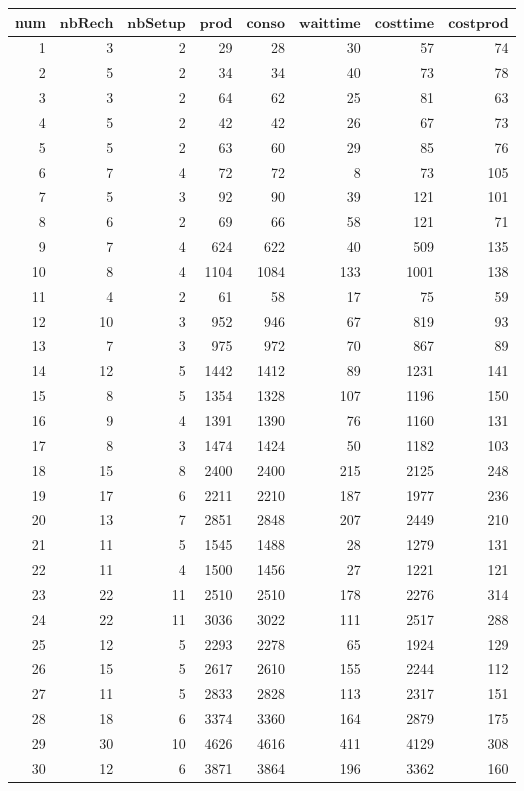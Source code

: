 {\begin{table}[H]
	\centering
	\small{
		\begin{tabular}{|r|r|r|r|r|r|r|r|}
			\hline
			\toprule
			\rowcolor{cyan}	\textbf{num} &$\mathbf{nbRech}$ & $\mathbf{nbSetup}$ & $\mathbf{prod}$ &  $\mathbf{conso} $ & $\mathbf{wait time}$ & $\mathbf{cost time}$ & $\mathbf{cost prod}$  \\
			\midrule
			\hline
			1	&	3	&	2	&	29	&	28	&	30	&	57	&	74	\\ \hline
			2	&	5	&	2	&	34	&	34	&	40	&	73	&	78	\\ \hline
			3	&	3	&	2	&	64	&	62	&	25	&	81	&	63	\\ \hline
			4	&	5	&	2	&	42	&	42	&	26	&	67	&	73	\\ \hline
			5	&	5	&	2	&	63	&	60	&	29	&	85	&	76	\\ \hline
			6	&	7	&	4	&	72	&	72	&	8	&	73	&	105	\\ \hline
			7	&	5	&	3	&	92	&	90	&	39	&	121	&	101	\\ \hline
			8	&	6	&	2	&	69	&	66	&	58	&	121	&	71	\\ \hline
			9	&	7	&	4	&	624	&	622	&	40	&	509	&	135	\\ \hline
			10	&	8	&	4	&	1104	&	1084	&	133	&	1001	&	138	\\ \hline
			11	&	4	&	2	&	61	&	58	&	17	&	75	&	59	\\ \hline
			12	&	10	&	3	&	952	&	946	&	67	&	819	&	93	\\ \hline
			13	&	7	&	3	&	975	&	972	&	70	&	867	&	89	\\ \hline
			14	&	12	&	5	&	1442	&	1412	&	89	&	1231	&	141	\\ \hline
			15	&	8	&	5	&	1354	&	1328	&	107	&	1196	&	150	\\ \hline
			16	&	9	&	4	&	1391	&	1390	&	76	&	1160	&	131	\\ \hline
			17	&	8	&	3	&	1474	&	1424	&	50	&	1182	&	103	\\ \hline
			18	&	15	&	8	&	2400	&	2400	&	215	&	2125	&	248	\\ \hline
			19	&	17	&	6	&	2211	&	2210	&	187	&	1977	&	236	\\ \hline
			20	&	13	&	7	&	2851	&	2848	&	207	&	2449	&	210	\\ \hline
			21	&	11	&	5	&	1545	&	1488	&	28	&	1279	&	131	\\ \hline
			22	&	11	&	4	&	1500	&	1456	&	27	&	1221	&	121	\\ \hline
			23	&	22	&	11	&	2510	&	2510	&	178	&	2276	&	314	\\ \hline
			24	&	22	&	11	&	3036	&	3022	&	111	&	2517	&	288	\\ \hline
			25	&	12	&	5	&	2293	&	2278	&	65	&	1924	&	129	\\ \hline
			26	&	15	&	5	&	2617	&	2610	&	155	&	2244	&	112	\\ \hline
			27	&	11	&	5	&	2833	&	2828	&	113	&	2317	&	151	\\ \hline
			28	&	18	&	6	&	3374	&	3360	&	164	&	2879	&	175	\\ \hline
			29	&	30	&	10	&	4626	&	4616	&	411	&	4129	&	308	\\ \hline
			30	&	12	&	6	&	3871	&	3864	&	196	&	3362	&	160	\\ \hline
			

\end{tabular}}
\end{table}}
